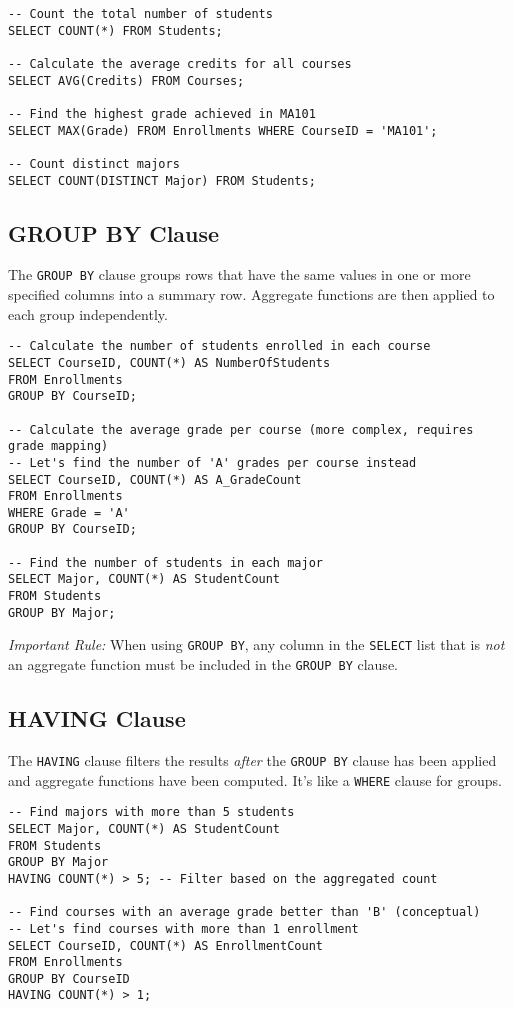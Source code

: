 \documentclass[12pt]{book}
\begin{document}
\begin{lstlisting}[caption={Aggregate Function Examples}, label=lst:aggregate_functions]
-- Count the total number of students
SELECT COUNT(*) FROM Students;

-- Calculate the average credits for all courses
SELECT AVG(Credits) FROM Courses;

-- Find the highest grade achieved in MA101
SELECT MAX(Grade) FROM Enrollments WHERE CourseID = 'MA101';

-- Count distinct majors
SELECT COUNT(DISTINCT Major) FROM Students;
\end{lstlisting}

\subsection{GROUP BY Clause}

The \texttt{GROUP BY} clause groups rows that have the same values in one or more specified columns into a summary row. Aggregate functions are then applied to each group independently.

\begin{lstlisting}[caption={GROUP BY Example}, label=lst:group_by]
-- Calculate the number of students enrolled in each course
SELECT CourseID, COUNT(*) AS NumberOfStudents
FROM Enrollments
GROUP BY CourseID;

-- Calculate the average grade per course (more complex, requires grade mapping)
-- Let's find the number of 'A' grades per course instead
SELECT CourseID, COUNT(*) AS A_GradeCount
FROM Enrollments
WHERE Grade = 'A'
GROUP BY CourseID;

-- Find the number of students in each major
SELECT Major, COUNT(*) AS StudentCount
FROM Students
GROUP BY Major;
\end{lstlisting}
\textit{Important Rule:} When using \texttt{GROUP BY}, any column in the \texttt{SELECT} list that is \emph{not} an aggregate function must be included in the \texttt{GROUP BY} clause.

\subsection{HAVING Clause}

The \texttt{HAVING} clause filters the results \emph{after} the \texttt{GROUP BY} clause has been applied and aggregate functions have been computed. It's like a \texttt{WHERE} clause for groups.

\begin{lstlisting}[caption={HAVING Clause Example}, label=lst:having_clause]
-- Find majors with more than 5 students
SELECT Major, COUNT(*) AS StudentCount
FROM Students
GROUP BY Major
HAVING COUNT(*) > 5; -- Filter based on the aggregated count

-- Find courses with an average grade better than 'B' (conceptual)
-- Let's find courses with more than 1 enrollment
SELECT CourseID, COUNT(*) AS EnrollmentCount
FROM Enrollments
GROUP BY CourseID
HAVING COUNT(*) > 1;
\end{lstlisting}
\end{document}
